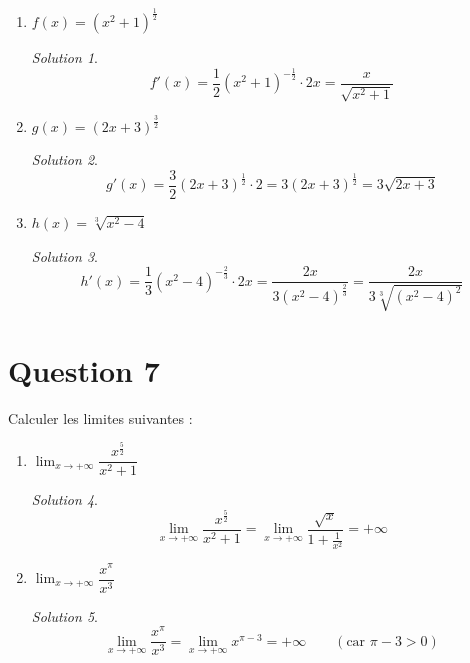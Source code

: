 \documentclass[
  12pt,
  letterpaper,
]{book}
\theoremstyle{remark}
\newtheorem*{solution}{Solution}
\begin{document}
\begin{enumerate}
\item
  \(f(x) = (x^2+1)^{\frac{1}{2}}\)

  \begin{solution}

  \[f'(x) = \frac{1}{2}(x^2+1)^{-\frac{1}{2}} \cdot 2x = \frac{x}{\sqrt{x^2+1}}\]

  \end{solution}
\item
  \(g(x) = (2x+3)^{\frac{3}{2}}\)

  \begin{solution}

  \[g'(x) = \frac{3}{2}(2x+3)^{\frac{1}{2}} \cdot 2 = 3(2x+3)^{\frac{1}{2}}=3\sqrt{2x+3}\]

  \end{solution}
\item
  \(h(x) = \sqrt[3]{x^2-4}\)

  \begin{solution}

  \[h'(x) = \frac{1}{3}(x^2-4)^{-\frac{2}{3}} \cdot 2x = \frac{2x}{3(x^2-4)^{\frac{2}{3}}}=\frac{2x}{3\sqrt[3]{(x^2-4)^2}}\]

  \end{solution}
\end{enumerate}

\hypertarget{question-7-1}{%
\section{Question 7}\label{question-7-1}}

Calculer les limites suivantes :

\begin{enumerate}
\item
  \(\lim_{x \to +\infty} \dfrac{x^{\frac{5}{2}}}{x^2+1}\)

  \begin{solution}

  \[\lim_{x \to +\infty} \frac{x^{\frac{5}{2}}}{x^2+1} = \lim_{x \to +\infty} \frac{\sqrt{x}}{1+\frac{1}{x^2}} = +\infty\]

  \end{solution}
\item
  \(\lim_{x \to +\infty} \dfrac{x^{\pi}}{x^3}\)

  \begin{solution}

  \[\lim_{x \to +\infty} \frac{x^{\pi}}{x^3} = \lim_{x \to +\infty} x^{\pi-3} = +\infty \qquad(\text{car }\pi - 3>0)\]

  \end{solution}
\end{enumerate}
\end{document}
